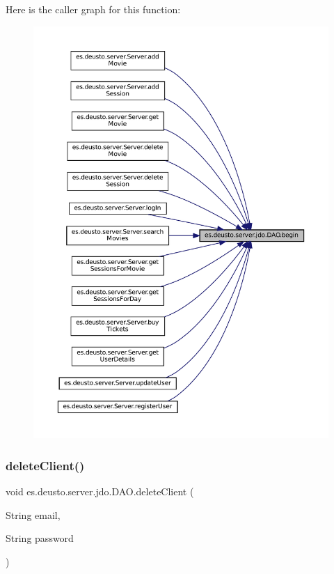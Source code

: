 Here is the caller graph for this function\+:
\nopagebreak
\begin{figure}[H]
\begin{center}
\leavevmode
\includegraphics[width=350pt]{classes_1_1deusto_1_1server_1_1jdo_1_1_d_a_o_ad923bb21c8273dabc601b85713703c89_icgraph}
\end{center}
\end{figure}
\mbox{\label{classes_1_1deusto_1_1server_1_1jdo_1_1_d_a_o_a9664ce68819a53c7b27add7f305a52b0}} 
\subsubsection{\texorpdfstring{deleteClient()}{deleteClient()}\hspace{0.1cm}{\footnotesize\ttfamily [1/2]}}
{\footnotesize\ttfamily void es.\+deusto.\+server.\+jdo.\+D\+A\+O.\+delete\+Client (\begin{DoxyParamCaption}\item[{String}]{email,  }\item[{String}]{password }\end{DoxyParamCaption})}



